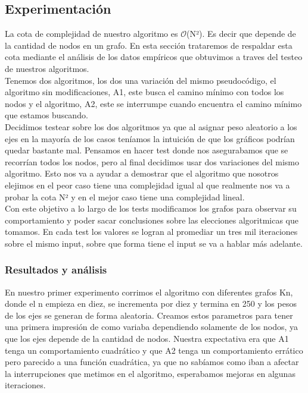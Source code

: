 \documentclass[spanish,12pt]{article}
\begin{document}
\subsection{Experimentación}

La cota de complejidad de nuestro algoritmo es $\mathcal{O}$(N²). Es decir que depende de la cantidad de nodos en un grafo.
En esta sección trataremos de respaldar esta cota mediante el análisis de los datos empíricos que obtuvimos a traves del testeo de nuestros algoritmos.
\\
Tenemos dos algoritmos, los dos una variación del mismo pseudocódigo, el algoritmo sin modificaciones, A1, este busca el camino mínimo con todos los nodos y el algoritmo, A2, este se interrumpe cuando encuentra el camino mínimo que estamos buscando.  
\\
 Decidimos testear sobre los dos algoritmos ya que al asignar peso aleatorio a los ejes en la mayoría de los casos teníamos la intuición de que los gráficos podrían quedar bastante mal. Pensamos en hacer test donde nos asegurabamos que se recorrían todos los nodos, pero al final decidimos usar dos variaciones del mismo algoritmo. Esto nos va a ayudar a demostrar que el algoritmo que nosotros elejimos en el peor caso tiene una complejidad igual al que realmente nos va a probar la cota N² y en el mejor caso tiene una complejidad lineal.
\\  
Con este objetivo a lo largo de los tests modificamos los grafos para observar su comportamiento y poder sacar conclusiones sobre las elecciones algoritmicas que tomamos. En cada test los valores se logran al promediar un tres mil iteraciones sobre el mismo input, sobre que forma tiene el input se va a hablar más adelante.

\subsubsection{Resultados y análisis}

En nuestro primer experimento corrimos el algoritmo con diferentes grafos Kn, donde el n empieza en diez, se incrementa por diez y termina en 250 y los pesos de los ejes se generan de forma aleatoria. Creamos estos parametros para tener una primera impresión de como variaba dependiendo solamente de los nodos, ya que los ejes depende de la cantidad de nodos. Nuestra expectativa era que A1 tenga un comportamiento cuadrático y que A2 tenga un comportamiento errático pero parecido a una función cuadrática, ya que no sabíamos como iban a afectar la interrupciones que metimos en el algoritmo, esperabamos mejoras en algunas iteraciones.
\end{document}
